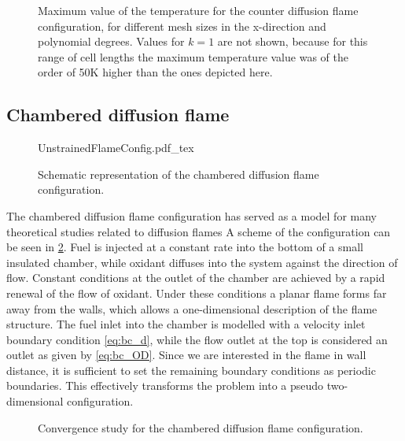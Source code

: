 \begin{figure}[tbp]
	\centering
	\caption{Maximum value of the temperature for the counter diffusion flame configuration, for different mesh sizes in the x-direction and polynomial degrees. Values for $k=1$ are not shown, because for this range of cell lengths the maximum temperature value was of the order of 50K higher than the ones depicted here.}
	\label{fig:TemperatureConvergenceDiffFlame}
\end{figure}
\FloatBarrier
\newpage
\subsection{Chambered diffusion flame}\label{ss:UDF}
\begin{figure}[b]
	\begin{center}
		\def\svgwidth{0.8\textwidth}
		{UnstrainedFlameConfig.pdf_tex}
		\caption{Schematic representation of the chambered diffusion flame configuration. }
		\label{fig:chamberedDifFlame}
	\end{center}
\end{figure}

The chambered diffusion flame configuration has served as a model for many theoretical studies related to diffusion flames\cite{matalonEffectThermalExpansion2010,rameauNumericalBifurcationChambered1985,matalonDiffusionFlamesChamber1980} A scheme of the configuration can be seen in \cref{fig:chamberedDifFlame}. Fuel is injected at a constant rate into the bottom of a small insulated chamber, while oxidant diffuses into the system against the direction of flow. Constant conditions at the outlet of the chamber are achieved by a rapid renewal of the flow of oxidant.  Under these conditions a planar flame forms far away from the walls, which allows a one-dimensional description of the flame structure.
The fuel inlet into the chamber is modelled with a velocity inlet boundary condition \cref{eq:bc_d}, while the flow outlet at the top is considered an outlet as given by \cref{eq:bc_OD}. Since we are interested in the flame in wall distance, it is sufficient to set the remaining boundary conditions as periodic boundaries. This effectively transforms the problem into a pseudo two-dimensional configuration.


\begin{figure}[t!]
	\centering
	\pgfplotsset{width=0.34\textwidth, compat=1.3}
	\caption{Convergence study for the chambered diffusion flame configuration.}
	\label{ConvergenceDiffFlame}
\end{figure}

